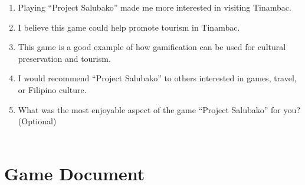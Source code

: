 \documentclass{research}
\begin{document}
\begin{enumerate}
  \item Playing ``Project Salubako'' made me more interested in visiting Tinambac.
  \item I believe this game could help promote tourism in Tinambac.
  \item This game is a good example of how gamification can be used for cultural
        preservation and tourism.
  \item I would recommend ``Project Salubako'' to others interested in games, travel,
        or Filipino culture.
  \item What was the most enjoyable aspect of the game ``Project Salubako'' for you?
        (Optional)\\[0.5em]
        \underline{\hspace{\linewidth}}\\[0.3em]
        \underline{\hspace{\linewidth}}
\end{enumerate}

\section*{Game Document}

\end{document}
